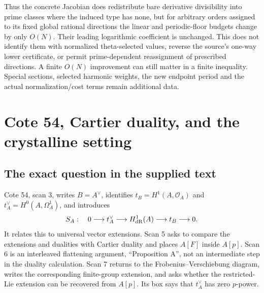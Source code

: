 \documentclass[11pt,a4paper]{article}
\theoremstyle{definition}\newtheorem{remark}[theorem]{Remark}
\begin{document}
Thus the concrete Jacobian does redistribute bare derivative divisibility into prime classes where the induced type has none, but for arbitrary orders assigned to its fixed global rational directions the linear and periodic-floor budgets change by only $O(N)$. Their leading logarithmic coefficient is unchanged. This does not identify them with normalized theta-selected values, reverse the source's one-way  lower certificate, or permit prime-dependent reassignment of prescribed directions. A finite $O(N)$ improvement can still matter in a finite inequality. Special sections, selected harmonic weights, the new endpoint period and the actual normalization/cost terms remain additional data.


\section{Cote 54, Cartier duality, and the crystalline setting}

\subsection{The exact question in the supplied text}

Cote 54, scan 3, writes $B=A^\vee$, identifies $t_B=H^1(A,\mathcal O_A)$ and $t_A^\vee=H^0(A,\Omega_A^1)$, and introduces
\begin{equation}\label{eq:SA}
 S_A:\quad 0\longrightarrow t_A^\vee\longrightarrow H^1_{\mathrm{dR}}(A)
 \longrightarrow t_B\longrightarrow0.
\end{equation}
It relates this to universal vector extensions. Scan 5 asks to compare the extensions and dualities with Cartier duality and places $A[F]$ inside $A[p]$. Scan 6 is an interleaved flattening argument, ``Proposition A'', not an intermediate step in the duality calculation. Scan 7 returns to the Frobenius--Verschiebung diagram, writes the corresponding finite-group extension, and asks whether the restricted-Lie extension can be recovered from $A[p]$. Its box says that $t_A^\vee$ has zero $p$-power.
\end{document}
